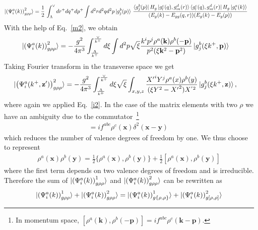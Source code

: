 \documentclass[10pt]{article}
\def\v#1{\mathbf{#1}}
\numberwithin{equation}{section}
\begin{document}
\begin{align}%
  \notag
\ket{  \left(\Psi^{a}_{i}(k) \right)^{2}_{g \rho \rho}} 
   & =  \frac{1}{2}\,\int_{\Lambda}^{\vee} d r^+ dq^+ dp^+ %
   \int d^2 r d^2q d^2p%
   \ket{g_{j}^{b}(p)}\,
   \frac{\bra{g_{j}^{b}(p)}H_{g}\ket{g_{l}^{c}(q),g_{m}^{d}(r)}\bra{g_{l}^{c}(q),g_{m}^{d}(r)}H_{g}\ket{g_{i}^{a}(k)}}{(E_{g}(k)-E_{gg}(q,r))(E_{g}(k)-E_{g}(p))}%
\end{align}
With the help of Eq.~\eqref{m2}, we obtain  
\begin{align}
 \ket{  \left(\Psi^{a}_{i}(k) \right)^{2}_{g \rho \rho}}  & = - \frac{g^2}{4\pi^3}%
   \int_{\frac{\Lambda}{k^{+}}}^{\frac{\vee}{k^{+}}} d \xi %
   \int d^{2}p 
   \sqrt{\xi} \frac{ k^{i}p^{j}\rho^{a}(\v{k})\rho^{b}(-\v{p}) }{ p^{2}(\xi \v{k}^{2}-\v{p}^{2}) }%
   \ket{g_{j}^{b}(\xi k^+,\v{p})}%
   \label{m2grr}
\end{align}
Taking Fourier transform in the transverse space we get 
\begin{align}%
  \ket{  \left(\Psi^{a}_{i}(k^+, \v{z'}) \right)^{2}_{g \rho \rho}}  %
   & = %
   -\frac{g^2}{4 \pi^3}%
   \int_{\frac{\Lambda}{k^{+}}}^{\frac{\vee}{k^{+}}} d \xi \sqrt{\xi}%
   \int_{x,y,z} \frac{{X'}^{i}Y^{j}\rho^{a}(x)\rho^{b}(y)}{(\xi Y^{2}-{X'}^{2}) {X}^{'2}}\ket{g_{j}^{b}(\xi k^+,\v{z})}, 
   \label{m2grrX}
\end{align}
where again we applied Eq.~\eqref{i2}. In the case of the matrix elements with two $\rho$ we have an ambiguity due to the commutator~\footnote{In momentum space,
$   [\rho^{a}(\v{k}), \rho^b(-\v{p})] = i f^{abc} \rho^c(\v{k}-\v{p}) $. 
} 
\begin{align}
  [\rho^{a}(\v{x}), \rho^b(\v{y})] = i f^{abc} \rho^c(\v{x}) \delta^2(\v{x}-\v{y})\,
\end{align}
which reduces the number of valence degrees of freedom by one. We thus choose to represent 
\begin{align}
  \rho^{a}(\v{x}) \rho^b(\v{y}) =   \frac12 \{\rho^{a}(\v{x}), \rho^b(\v{y})\} + \frac12  [\rho^{a}(\v{x}), \rho^b(\v{y})]  
\end{align}
where the first term depends on two valence degrees of freedom and is irreducible. Therefore the sum of   $\ket{ \left(\Psi^{a}_{i}(k) \right)^{1}_{g \rho \rho} }$ and  $\ket{ \left(\Psi^{a}_{i}(k) \right)^{2}_{g \rho \rho} }$ can be rewritten as 
\begin{align}
\ket{ \left(\Psi^{a}_{i}(k) \right)^{1}_{g \rho \rho} }
+\ket{ \left(\Psi^{a}_{i}(k) \right)^{2}_{g \rho \rho} }  = 
\ket{ \left(\Psi^{a}_{i}(k) \right)^{1}_{g \{\rho, \rho\} } }
+\ket{ \left(\Psi^{a}_{i}(k) \right)^{2}_{g [\rho, \rho] } }  
\end{align}
\end{document}
